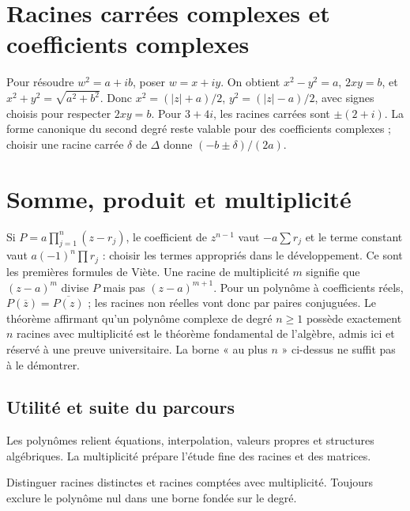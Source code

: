 \documentclass[../cours_tle.tex]{subfiles}
\begin{document}
\section{Racines carrées complexes et coefficients complexes}
Pour résoudre $w^2=a+ib$, poser $w=x+iy$. On obtient
$x^2-y^2=a$, $2xy=b$, et $x^2+y^2=\sqrt{a^2+b^2}$.
Donc $x^2=(|z|+a)/2$, $y^2=(|z|-a)/2$, avec signes choisis pour respecter $2xy=b$.
Pour $3+4i$, les racines carrées sont $\pm(2+i)$.
La forme canonique du second degré reste valable pour des coefficients complexes ; choisir une racine carrée $\delta$ de $\Delta$ donne $(-b\pm\delta)/(2a)$.
\section{Somme, produit et multiplicité}
Si $P=a\prod_{j=1}^n(z-r_j)$, le coefficient de $z^{n-1}$ vaut $-a\sum r_j$ et le terme constant vaut $a(-1)^n\prod r_j$ : choisir les termes appropriés dans le développement. Ce sont les premières formules de Viète.
Une racine de multiplicité $m$ signifie que $(z-a)^m$ divise $P$ mais pas $(z-a)^{m+1}$.
Pour un polynôme à coefficients réels, $P(\overline z)=\overline{P(z)}$ ; les racines non réelles vont donc par paires conjuguées.
Le théorème affirmant qu'un polynôme complexe de degré $n\ge1$ possède exactement $n$ racines avec multiplicité est le théorème fondamental de l'algèbre, admis ici et réservé à une preuve universitaire. La borne « au plus $n$ » ci-dessus ne suffit pas à le démontrer.
\begin{finchapitre}
\section{Utilité et suite du parcours}
Les polynômes relient équations, interpolation, valeurs propres et structures algébriques. La multiplicité prépare l'étude fine des racines et des matrices.
\begin{retenir}
Distinguer racines distinctes et racines comptées avec multiplicité. Toujours exclure le polynôme nul dans une borne fondée sur le degré.
\end{retenir}
\end{finchapitre}
\end{document}
